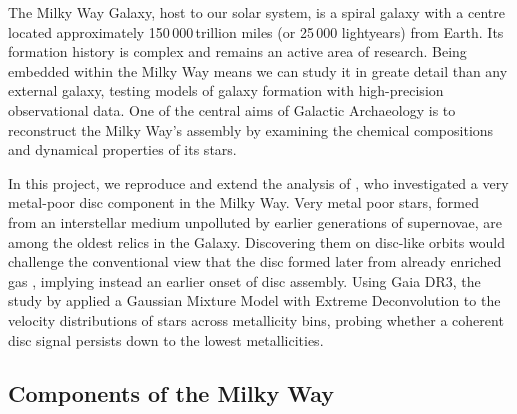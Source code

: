 \documentclass[a4paper,12pt]{article}
\begin{document}
The Milky Way Galaxy, host to our solar system, is a spiral galaxy with a centre 
located approximately 150\,000\,trillion miles (or 25\,000 light\-years) from Earth. 
Its formation history is complex and remains an active area of research. Being embedded 
within the Milky Way means we can study it in greate detail than any external galaxy, 
testing models of galaxy formation with high-precision observational data. One of the 
central aims of Galactic Archaeology is to reconstruct the Milky Way’s assembly by 
examining the chemical compositions and dynamical properties of its stars.

In this project, we reproduce and extend the analysis of \citet{zhang2024existencemetalpoordiscmilky}, 
who investigated a very metal-poor disc component in the Milky Way. Very metal poor 
stars, formed from an interstellar medium unpolluted by earlier generations of 
supernovae, are among the oldest relics in the Galaxy. Discovering them on disc-like 
orbits would challenge the conventional view that the disc formed later from already 
enriched gas \citep{BlandHawthorn2016}, implying instead an earlier onset of disc 
assembly. Using Gaia DR3, the study by \citet{zhang2024existencemetalpoordiscmilky} 
applied a Gaussian Mixture Model with Extreme Deconvolution to the velocity 
distributions of stars across metallicity bins, probing whether a coherent disc signal 
persists down to the lowest metallicities.

\subsection{Components of the Milky Way}
\end{document}
